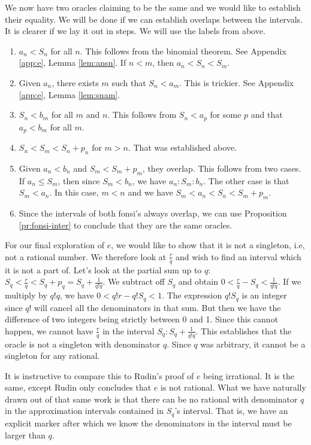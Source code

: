 \documentclass[12pt]{article}
\theoremstyle{remark}
\begin{document}
We now have two oracles claiming to be the same and we would like to establish their equality. We will be done if we can establish overlaps between the intervals. It is clearer if we lay it out in steps. We will use the labels from above. 
\begin{enumerate}
    \item $a_n < S_n$ for all $n$. This follows from the binomial theorem. See Appendix \ref{app:e}, Lemma \ref{lem:ansn}. If $n < m$, then $a_n < S_n < S_m$.
    \item Given $a_n$, there exists $m$ such that $S_n < a_m$. This is trickier. See Appendix \ref{app:e}, Lemma \ref{lem:snam}. 
    \item $S_n < b_m$ for all $m$ and $n$. This follows from $S_n < a_p$ for some $p$ and that $a_p < b_m$ for all $m$.
    \item $S_n < S_m < S_n + p_n$ for $m > n$. That was established above. 
    \item Given $a_n < b_n$ and $S_m < S_m + p_m$, they overlap. This follows from two cases. If $a_n \leq S_m$, then since $S_m < b_n$, we have $a_n : S_m : b_n$. The other case is that $S_m < a_n$. In this case, $m < n$ and we have $S_m < a_n < S_n < S_m + p_m$. 
    \item Since the intervals of both fonsi's always overlap, we can use Proposition \ref{pr:fonsi-inter} to conclude that they are the same oracles. 
\end{enumerate}

For our final exploration of $e$, we would like to show that it is not a singleton, i.e, not a rational number. We therefore look at $\tfrac{r}{q}$ and wish to find an interval which it is not a part of.  Let's look at the partial sum up to $q$:  $S_q < \tfrac{r}{q} <  S_q + p_q = S_q + \frac{1}{q!q}$. We subtract off $S_q$ and obtain $0 < \tfrac{r}{q} - S_q < \tfrac{1}{q! q}$. If we multiply by $q! q$, we have $0 < q! r - q!S_q < 1$.  The expression $q! S_q$ is an integer since $q!$ will cancel all the denominators in that sum. But then we have the difference of two integers being strictly between 0 and 1. Since this cannot happen, we cannot have $\tfrac{r}{q}$ in the interval $S_q : S_q + \frac{1}{q! q}$. This establishes that the oracle is not a singleton with denominator $q$. Since $q$ was arbitrary, it cannot be a singleton for any rational. 

It is instructive to compare this to Rudin's proof of $e$ being irrational. It is the same, except Rudin only concludes that $e$ is not rational. What we have naturally drawn out of that same work is that there can be no rational with denominator $q$ in the approximation intervals contained in $S_q$'s interval. That is, we have an explicit marker after which we know the denominators in the interval must be larger than $q$. 
\end{document}
